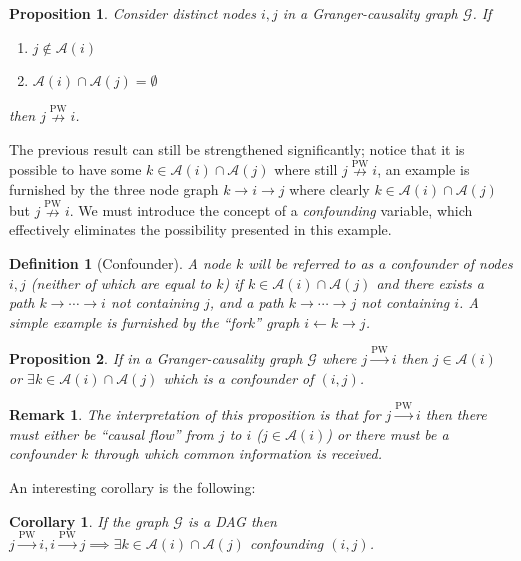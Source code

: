\documentclass{statsoc}
\def\pwgc{\overset{\text{PW}}{\rightarrow}}  %
\def\npwgc{\overset{\text{PW}}{\nrightarrow}}  %
\def\gcg{\mathcal{G}}  %
\newcommand{\anc}[1]{\mathcal{A}(#1)}  %
\newcommand{\gcgpath}[2]{#1 \rightarrow \cdots \rightarrow #2}  %
\newtheorem{corollary}{Corollary}
\newtheorem{proposition}{Proposition}
\newtheorem{remark}{Remark}
\newtheorem{definition}{Definition}
\begin{document}
\begin{proposition}
  Consider distinct nodes $i, j$ in a Granger-causality graph $\gcg$.
  If

  \begin{enumerate}[label=(\alph*)]
    \item{$j \not\in \anc{i}$}
    \item{$\anc{i}\cap\anc{j} = \emptyset$}
  \end{enumerate}

  then $j \npwgc i$.
\end{proposition}

The previous result can still be strengthened significantly; notice
that it is possible to have some $k \in \anc{i} \cap \anc{j}$ where still
$j \npwgc i$, an example is furnished by the three node graph
$k \rightarrow i \rightarrow j$ where clearly
$k \in \anc{i}\cap\anc{j}$ but $j \npwgc i$.  We must introduce the concept
of a \textit{confounding} variable, which effectively eliminates the
possibility presented in this example.

\begin{definition}[Confounder]
  A node $k$ will be referred to as a \textit{confounder} of nodes
  $i, j$ (neither of which are equal to $k$) if
  $k \in \anc{i} \cap \anc{j}$ and there exists a path
  $\gcgpath{k}{i}$ not containing $j$, and a path $\gcgpath{k}{j}$ not
  containing $i$. A simple example is furnished by the ``fork'' graph
  $i \leftarrow k \rightarrow j$.
\end{definition}

\begin{proposition}
  \label{prop:ancestor_properties}
  If in a Granger-causality graph $\gcg$ where $j \pwgc i$ then
  $j \in \anc{i}$ or $\exists k \in \anc{i} \cap\anc{j}$ which is a
  confounder of $(i, j)$.
\end{proposition}

\begin{remark}
  The interpretation of this proposition is that for $j \pwgc i$ then
  there must either be ``causal flow'' from $j$ to $i$
  ($j \in \anc{i}$) or there must be a confounder $k$ through which
  common information is received.
\end{remark}

An interesting corollary is the following:

\begin{corollary}
  If the graph $\gcg$ is a DAG then $j \pwgc i, i \pwgc j \implies \exists k \in \anc{i} \cap \anc{j}$ confounding $(i, j)$.
\end{corollary}
\end{document}
